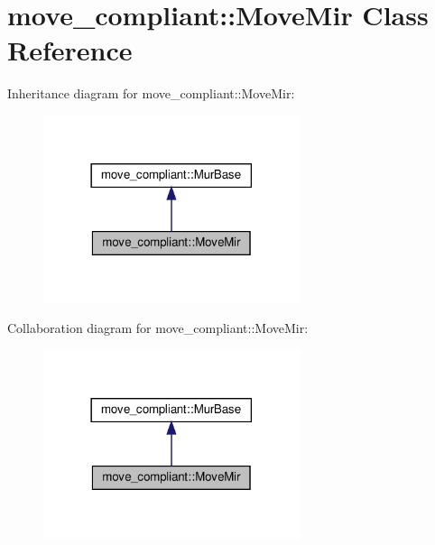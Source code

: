\hypertarget{classmove__compliant_1_1MoveMir}{}\section{move\+\_\+compliant\+:\+:Move\+Mir Class Reference}
\label{classmove__compliant_1_1MoveMir}


Inheritance diagram for move\+\_\+compliant\+:\+:Move\+Mir\+:
\nopagebreak
\begin{figure}[H]
\begin{center}
\leavevmode
\includegraphics[width=213pt]{da/ddc/classmove__compliant_1_1MoveMir__inherit__graph}
\end{center}
\end{figure}


Collaboration diagram for move\+\_\+compliant\+:\+:Move\+Mir\+:
\nopagebreak
\begin{figure}[H]
\begin{center}
\leavevmode
\includegraphics[width=213pt]{d0/dbf/classmove__compliant_1_1MoveMir__coll__graph}
\end{center}
\end{figure}
